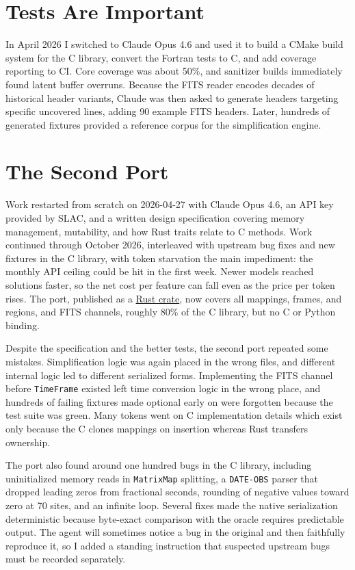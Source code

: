 \documentclass[11pt,twoside]{article}
\begin{document}
\section{Tests Are Important}

In April 2026 I switched to Claude Opus 4.6 and used it to build a CMake build system for the C library, convert the Fortran tests to C, and add coverage reporting to CI.
Core coverage was about 50\%, and sanitizer builds immediately found latent buffer overruns.
Because the FITS reader encodes decades of historical header variants, Claude was then asked to generate headers targeting specific uncovered lines, adding 90 example FITS headers.
Later, hundreds of generated fixtures provided a reference corpus for the simplification engine.

\section{The Second Port}

Work restarted from scratch on 2026-04-27 with Claude Opus 4.6, an API key provided by SLAC, and a written design specification covering memory management, mutability, and how Rust traits relate to C methods.
Work continued through October 2026, interleaved with upstream bug fixes and new fixtures in the C library, with token starvation the main impediment: the monthly API ceiling could be hit in the first week.
Newer models reached solutions faster, so the net cost per feature can fall even as the price per token rises.
The port, published as a \href{https://crates.io/crates/starlink-ast}{Rust crate}, now covers all mappings, frames, and regions, and FITS channels, roughly 80\% of the C library, but no C or Python binding.

Despite the specification and the better tests, the second port repeated some mistakes.
Simplification logic was again placed in the wrong files, and different internal logic led to different serialized forms.
Implementing the FITS channel before \texttt{TimeFrame} existed left time conversion logic in the wrong place, and hundreds of failing fixtures made optional early on were forgotten because the test suite was green.
Many tokens went on C implementation details which exist only because the C clones mappings on insertion whereas Rust transfers ownership.

The port also found around one hundred bugs in the C library, including uninitialized memory reads in \texttt{MatrixMap} splitting, a \texttt{DATE-OBS} parser that dropped leading zeros from fractional seconds, rounding of negative values toward zero at 70 sites, and an infinite loop.
Several fixes made the native serialization deterministic because byte-exact comparison with the oracle requires predictable output.
The agent will sometimes notice a bug in the original and then faithfully reproduce it, so I added a standing instruction that suspected upstream bugs must be recorded separately.
\end{document}
